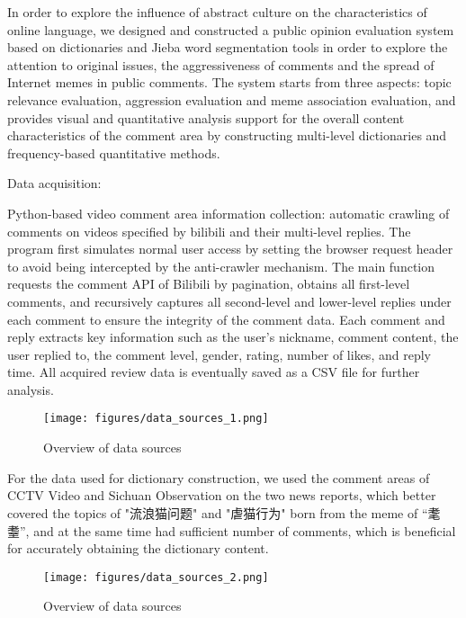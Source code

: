 \documentclass[12pt,a4paper]{ctexart}
\begin{document}
In order to explore the influence of abstract culture on the characteristics of online language, we designed and constructed a public opinion evaluation system based on dictionaries and Jieba word segmentation tools in order to explore the attention to original issues, the aggressiveness of comments and the spread of Internet memes in public comments. The system starts from three aspects: topic relevance evaluation, aggression evaluation and meme association evaluation, and provides visual and quantitative analysis support for the overall content characteristics of the comment area by constructing multi-level dictionaries and frequency-based quantitative methods.

Data acquisition:

Python-based video comment area information collection: automatic crawling of comments on videos specified by bilibili and their multi-level replies. The program first simulates normal user access by setting the browser request header to avoid being intercepted by the anti-crawler mechanism. The main function requests the comment API of Bilibili by pagination, obtains all first-level comments, and recursively captures all second-level and lower-level replies under each comment to ensure the integrity of the comment data. Each comment and reply extracts key information such as the user's nickname, comment content, the user replied to, the comment level, gender, rating, number of likes, and reply time. All acquired review data is eventually saved as a CSV file for further analysis.

\begin{figure}[htbp]
    \centering
    \texttt{[image: figures/data\_sources\_1.png]}
    \caption{Overview of data sources}
    \label{fig:data_sources_1}
\end{figure}

For the data used for dictionary construction, we used the comment areas of CCTV Video and Sichuan Observation on the two news reports, which better covered the topics of "流浪猫问题" and "虐猫行为" born from the meme of “耄耋”, and at the same time had sufficient number of comments, which is beneficial for accurately obtaining the dictionary content.

\begin{figure}[htbp]
    \centering
    \texttt{[image: figures/data\_sources\_2.png]}
    \caption{Overview of data sources}
    \label{fig:data_sources_2}
\end{figure}
\end{document}
